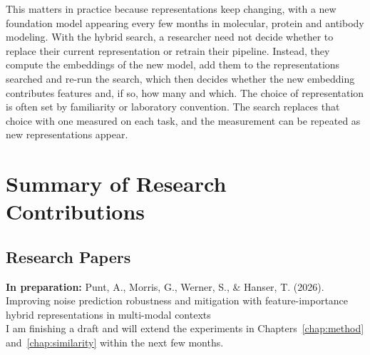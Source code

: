This matters in practice because representations keep changing, with a new foundation model appearing every few months in molecular, protein and antibody modeling. With the hybrid search, a researcher need not decide whether to replace their current representation or retrain their pipeline. Instead, they compute the embeddings of the new model, add them to the representations searched and re-run the search, which then decides whether the new embedding contributes features and, if so, how many and which. The choice of representation is often set by familiarity or laboratory convention. The search replaces that choice with one measured on each task, and the measurement can be repeated as new representations appear.


\pagebreak
\chapter*{Summary of Research Contributions}


\section*{Research Papers}

\textbf{In preparation:} Punt, A., Morris, G., Werner, S., \& Hanser, T. (2026). Improving noise prediction robustness and mitigation with feature-importance hybrid representations in multi-modal contexts \\ I am finishing a draft and will extend the experiments in Chapters~\ref{chap:method} and~\ref{chap:similarity} within the next few months.

